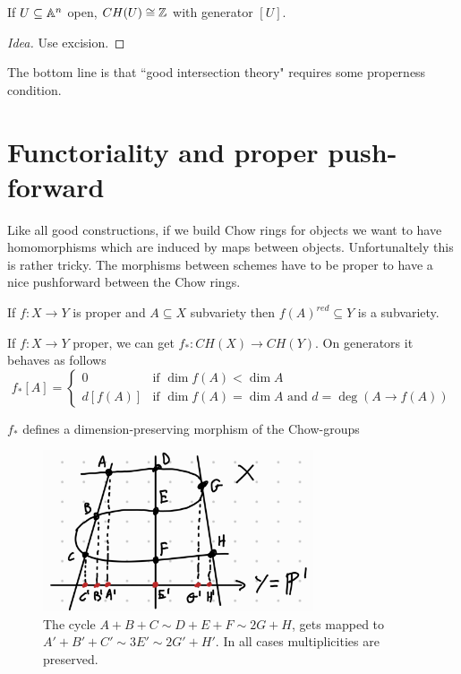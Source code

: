 \begin{corollary}
If $U\subseteq \mathbb{A}^n$ open, $CH(U)\cong \mathbb{Z}$ with generator $[U]$.
\end{corollary}
\begin{proof}[Idea]
Use excision.
\end{proof}


\begin{center}
The bottom line is that ``good intersection theory" requires some properness condition.
\end{center}


\section{Functoriality and proper push-forward}
Like all good constructions, if we build Chow rings for objects we want to have homomorphisms which are induced by maps between objects. Unfortunaltely this is rather tricky. The morphisms between schemes have to be proper to have a nice pushforward between the Chow rings. 

\begin{remark}
If $f:X\to Y$ is proper and $A\subseteq X$ subvariety then $f(A)^{red}\subseteq Y$ is a subvariety.
\end{remark}



\begin{theorem}
If $f:X\to Y$ proper, we can get $f_\ast:CH(X)\to CH(Y)$. On generators it behaves as follows
\[f_\ast[A]=\begin{cases}
0 &\text{if }\dim f(A)<\dim A\\
d[f(A)] &\text{if }\dim f(A)=\dim A\text{ and }d=\deg(A\to f(A))
\end{cases}\]
\end{theorem}

\begin{theorem}
$f_\ast$ defines a dimension-preserving morphism of the Chow-groups
\end{theorem}

\begin{figure}[!htb]
	\centering
	\includegraphics[width=8cm]{Images/degree-pushforward.png}
	\caption{The cycle $A+B+C\sim D+E+F\sim 2G+H$, gets mapped to $A'+B'+C'\sim 3E'\sim 2G'+H'$. In all cases multiplicities are preserved.}
\end{figure}


